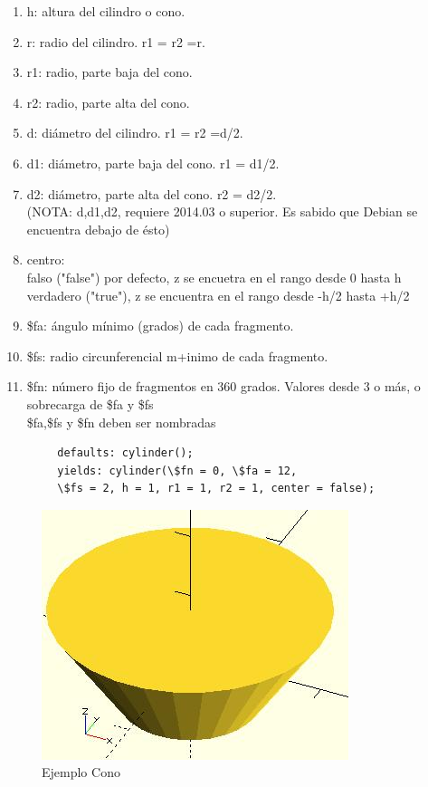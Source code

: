 \documentclass{article}
\begin{document}
\begin{enumerate}
    \item h: altura del cilindro o cono.
    \item r: radio del cilindro. r1 = r2 =r.
    \item r1: radio, parte baja del cono.
    \item r2: radio, parte alta del cono.
    \item d: diámetro del cilindro. r1 = r2 =d/2.
    \item d1: diámetro, parte baja del cono. r1 = d1/2.
    \item d2: diámetro, parte alta del cono. r2 = d2/2.\\
    (NOTA: d,d1,d2, requiere 2014.03 o superior. Es sabido que Debian se encuentra debajo de ésto)
    \item centro:\\
    falso ("false") por defecto, z se encuetra en el rango desde 0 hasta h\\
    verdadero ("true"), z se encuentra en el rango desde -h/2 hasta +h/2
    \item \$fa: ángulo mínimo (grados) de cada fragmento.
    \item \$fs: radio circunferencial m+inimo de cada fragmento.
    \item \$fn: número fijo de fragmentos en 360 grados. Valores desde 3 o más, o sobrecarga de \$fa y \$fs\\
    
    \$fa,\$fs y \$fn deben ser nombradas
\end{enumerate}
    
    \begin{verbatim}
        defaults: cylinder();  
        yields: cylinder(\$fn = 0, \$fa = 12, 
        \$fs = 2, h = 1, r1 = 1, r2 = 1, center = false);
    \end{verbatim}
    
    \begin{figure}[h!]
        \centering
        \includegraphics[scale=0.5]{Imagenes/OpenSCAD_Cone_15x10x20.jpg}
        \caption{Ejemplo Cono}
        \label{fig:ejemplo_cono}
    \end{figure}
    
\end{document}
